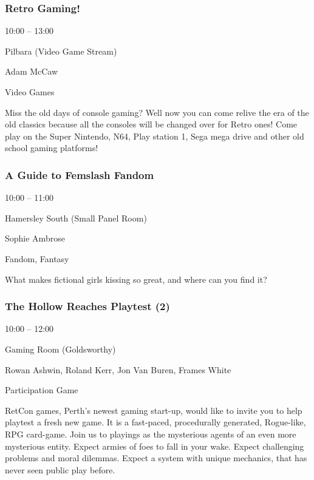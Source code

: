 \documentclass{scrreprt}
\begin{document}
\begin{multicols}{2}
\subsubsection*{Retro Gaming!}\begin{description}
\setlength{\itemsep}{0pt}
\setlength{\parsep}{0pt}
\setlength{\parskip}{0pt}
\item[Time:]{10:00 -- 13:00}
\item[Venue:]{Pilbara (Video Game Stream)}
\item[People:]{Adam McCaw}
\item[Tags:]{Video Games}\end{description}
Miss the old days of console gaming? Well now you can come relive the era of the old classics because all the consoles will be changed over for Retro ones! Come play on the Super Nintendo, N64, Play station 1, Sega mega drive and other old school gaming platforms!
\subsubsection*{A Guide to Femslash Fandom}\begin{description}
\setlength{\itemsep}{0pt}
\setlength{\parsep}{0pt}
\setlength{\parskip}{0pt}
\item[Time:]{10:00 -- 11:00}
\item[Venue:]{Hamersley South (Small Panel Room)}
\item[People:]{Sophie Ambrose}
\item[Tags:]{Fandom, Fantasy}\end{description}
What makes fictional girls kissing so great, and where can you find it?
\subsubsection*{The Hollow Reaches Playtest (2)}\begin{description}
\setlength{\itemsep}{0pt}
\setlength{\parsep}{0pt}
\setlength{\parskip}{0pt}
\item[Time:]{10:00 -- 12:00}
\item[Venue:]{Gaming Room (Goldsworthy)}
\item[People:]{Rowan Ashwin, Roland Kerr, Jon Van Buren, Frames White}
\item[Tags:]{Participation Game}\end{description}
RetCon games, Perth's newest gaming start-up, would like to invite you to help playtest a fresh new game. It is a fast-paced, procedurally generated, Rogue-like, RPG card-game. Join us to playings as the mysterious agents of an even more mysterious entity. Expect armies of foes to fall in your wake. Expect challenging problems and moral dilemmas. Expect a system with unique mechanics, that has never seen public play before.

\end{multicols}
\end{document}
